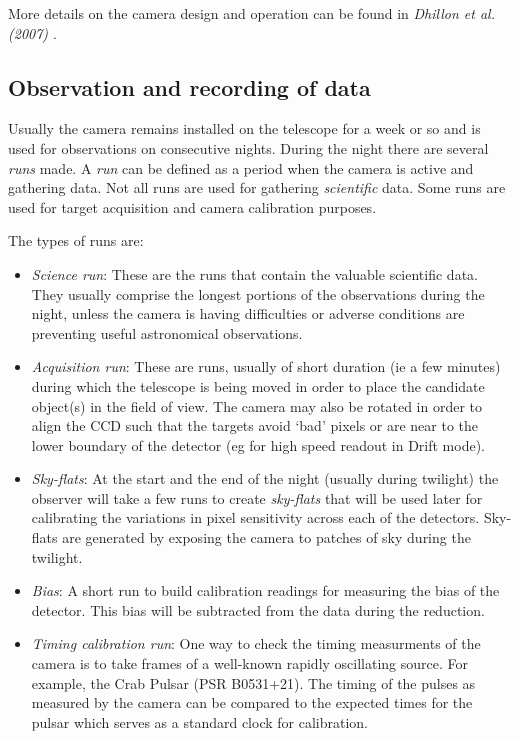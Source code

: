 \documentclass[a4paper,10pt]{article}
\begin{document}
More details on the camera design and operation can be found in \emph{Dhillon et al. (2007) \cite{dhillon07}}.

\subsection{Observation and recording of data}

Usually the camera remains installed on the telescope for a week or so and is used for observations on consecutive nights. During the night there are several \emph{runs} made. A \emph{run} can be defined as a period when the camera is active and gathering data. Not all runs are used for gathering \emph{scientific} data. Some runs are used for target acquisition and camera calibration purposes. 

The types of runs are: 
\begin{itemize}
	\item \emph{Science run}: These are the runs that contain the valuable scientific data. They usually comprise the longest portions of the observations during the night, unless the camera is having difficulties or adverse conditions are preventing useful astronomical observations.
	\item \emph{Acquisition run}: These are runs, usually of short duration (ie a few minutes) during which the telescope is being moved in order to place the candidate object(s) in the field of view. The camera may also be rotated in order to align the CCD such that the targets avoid `bad' pixels or are near to the lower boundary of the detector (eg for high speed readout in Drift mode). 
	\item \emph{Sky-flats}: At the start and the end of the night (usually during twilight) the observer will take a few runs to create \emph{sky-flats} that will be used later for calibrating the variations in pixel sensitivity across each of the detectors.  Sky-flats are generated by exposing the camera to patches of sky during the twilight. 
	\item \emph{Bias}: A short run to build calibration readings for measuring the bias of the detector. This bias will be subtracted from the data during the reduction. 
	\item \emph{Timing calibration run}: One way to check the timing measurments of the camera is to take frames of a well-known rapidly oscillating source. For example, the Crab Pulsar (PSR B0531+21). The timing of the pulses as measured by the camera can be compared to the expected times for the pulsar which serves as a standard clock for calibration.
\end{itemize}
\end{document}
